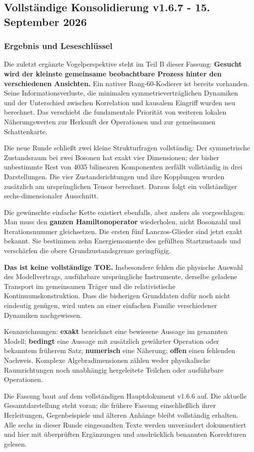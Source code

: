 \subsection{Vollständige Konsolidierung v1.6.7 - 15. September
2026}\label{vollstuxe4ndige-konsolidierung-v1.6.7---15.-september-2026}

\subsubsection{Ergebnis und
Leseschlüssel}\label{ergebnis-und-leseschluxfcssel-1}

Die zuletzt ergänzte Vogelperspektive steht im Teil B dieser Fassung:
\textbf{Gesucht wird der kleinste gemeinsame beobachtbare Prozess hinter
den verschiedenen Ansichten.} Ein nativer Rang-60-Kodierer ist bereits
vorhanden. Seine Informationsverluste, die minimalen
symmetrieverträglichen Dynamiken und der Unterschied zwischen
Korrelation und kausalem Eingriff wurden neu berechnet. Das verschiebt
die fundamentale Priorität von weiteren lokalen Näherungswerten zur
Herkunft der Operationen und zur gemeinsamen Schattenkarte.

Die neue Runde schließt zwei kleine Strukturfragen vollständig: Der
symmetrische Zustandsraum bei zwei Bosonen hat exakt vier Dimensionen;
der bisher unbestimmte Rest von 4035 bilinearen Komponenten zerfällt
vollständig in drei Darstellungen. Die vier Zustandsrichtungen und ihre
Kopplungen wurden zusätzlich am ursprünglichen Tensor berechnet. Daraus
folgt ein vollständiger sechs-dimensionaler Ausschnitt.

Die gewünschte einfache Kette existiert ebenfalls, aber anders als
vorgeschlagen: Man muss den \textbf{ganzen Hamiltonoperator}
wiederholen, nicht Bosonzahl und Iterationsnummer gleichsetzen. Die
ersten fünf Lanczos-Glieder sind jetzt exakt bekannt. Sie bestimmen zehn
Energiemomente des gefüllten Startzustands und verschärfen die obere
Grundzustandsgrenze geringfügig.

\textbf{Das ist keine vollständige TOE.} Insbesondere fehlen die
physische Auswahl des Modellvertrags, ausführbare ursprüngliche
Instrumente, derselbe geladene Transport im gemeinsamen Träger und die
relativistische Kontinuumskonstruktion. Dass die bisherigen Grunddaten
dafür noch nicht eindeutig genügen, wird unten an einer einfachen
Familie verschiedener Dynamiken nachgewiesen.

Kennzeichnungen: \textbf{exakt} bezeichnet eine bewiesene Aussage im
genannten Modell; \textbf{bedingt} eine Aussage mit zusätzlich gewährter
Operation oder bekanntem früherem Satz; \textbf{numerisch} eine
Näherung; \textbf{offen} einen fehlenden Nachweis. Komplexe
Algebradimensionen zählen weder physikalische Raumrichtungen noch
unabhängig hergeleitete Teilchen oder ausführbare Operationen.

Die Fassung baut auf dem vollständigen Hauptdokument v1.6.6 auf. Die
aktuelle Gesamtdarstellung steht voran; die frühere Fassung
einschließlich ihrer Herleitungen, Gegenbeispiele und älteren Anhänge
bleibt vollständig erhalten. Alle sechs in dieser Runde eingesandten
Texte werden unverändert dokumentiert und hier mit überprüften
Ergänzungen und ausdrücklich benannten Korrekturen gelesen.

